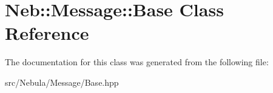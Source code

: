 \hypertarget{classNeb_1_1Message_1_1Base}{\section{\-Neb\-:\-:\-Message\-:\-:\-Base \-Class \-Reference}
\label{classNeb_1_1Message_1_1Base}
}


\-The documentation for this class was generated from the following file\-:\begin{DoxyCompactItemize}
\item 
src/\-Nebula/\-Message/\-Base.\-hpp\end{DoxyCompactItemize}
